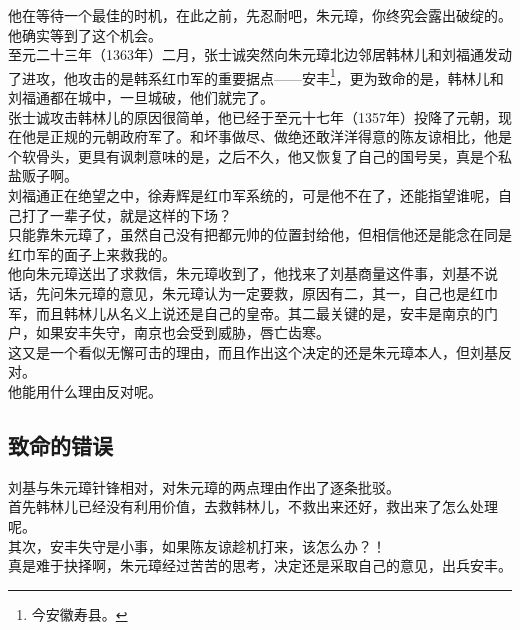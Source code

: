\begin{multicols}{\theparacolNo}
他在等待一个最佳的时机，在此之前，先忍耐吧，朱元璋，你终究会露出破绽的。\\

他确实等到了这个机会。\\

至元二十三年（1363年）二月，张士诚突然向朱元璋北边邻居韩林儿和刘福通发动了进攻，他攻击的是韩系红巾军的重要据点——安丰\footnote{今安徽寿县。}，更为致命的是，韩林儿和刘福通都在城中，一旦城破，他们就完了。\\

张士诚攻击韩林儿的原因很简单，他已经于至元十七年（1357年）投降了元朝，现在他是正规的元朝政府军了。和坏事做尽、做绝还敢洋洋得意的陈友谅相比，他是个软骨头，更具有讽刺意味的是，之后不久，他又恢复了自己的国号吴，真是个私盐贩子啊。\\

刘福通正在绝望之中，徐寿辉是红巾军系统的，可是他不在了，还能指望谁呢，自己打了一辈子仗，就是这样的下场？\\

只能靠朱元璋了，虽然自己没有把都元帅的位置封给他，但相信他还是能念在同是红巾军的面子上来救我的。\\

他向朱元璋送出了求救信，朱元璋收到了，他找来了刘基商量这件事，刘基不说话，先问朱元璋的意见，朱元璋认为一定要救，原因有二，其一，自己也是红巾军，而且韩林儿从名义上说还是自己的皇帝。其二最关键的是，安丰是南京的门户，如果安丰失守，南京也会受到威胁，唇亡齿寒。\\

这又是一个看似无懈可击的理由，而且作出这个决定的还是朱元璋本人，但刘基反对。\\

他能用什么理由反对呢。\\

\subsection{致命的错误}
刘基与朱元璋针锋相对，对朱元璋的两点理由作出了逐条批驳。\\

首先韩林儿已经没有利用价值，去救韩林儿，不救出来还好，救出来了怎么处理呢。\\

其次，安丰失守是小事，如果陈友谅趁机打来，该怎么办？！\\

真是难于抉择啊，朱元璋经过苦苦的思考，决定还是采取自己的意见，出兵安丰。\\


\end{multicols}
